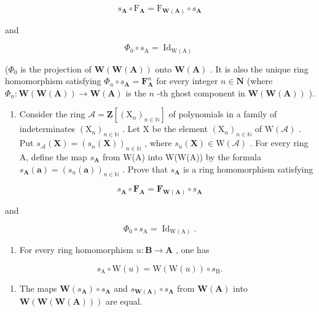 \[
s _ {\mathbf {A}} \circ \mathrm{F} _ {\mathbf {A}} = \mathrm{F} _ {\mathbf {W} (\mathbf {A})} \circ s _ {\mathbf {A}}
\]

and

\[
\Phi_ {0} \circ s _ {\mathrm{A}} = \operatorname{Id} _ {\mathrm{W(A)}}
\]

(\(\Phi_0\) is the projection of \(\mathbf{W}(\mathbf{W}(\mathbf{A}))\) onto \(\mathbf{W}(\mathbf{A})\) . It is also the unique ring homomorphism satisfying \(\Phi_n\circ s_{\mathbf{A}} = \mathbf{F}_{\mathbf{A}}^{n}\) for every integer \(n\in \mathbf{N}\) (where \(\Phi_n:\mathbf{W}(\mathbf{W}(\mathbf{A}))\to \mathbf{W}(\mathbf{A})\) is the \(n\) -th ghost component in \(\mathbf{W}(\mathbf{W}(\mathbf{A}))\) ).

\begin{enumerate}
\def\labelenumi{\alph{enumi})}
\setcounter{enumi}{1}
\tightlist
\item
  Consider the ring \(\mathcal{A} = \mathbf{Z}[(\mathrm{X}_n)_{n\in \mathbb{N}}]\) of polynomials in a family of indeterminates \((\mathrm{X}_n)_{n\in \mathbb{N}}\) . Let X be the element \((\mathrm{X}_n)_{n\in \mathbb{N}}\) of \(\mathrm{W}(\mathcal{A})\) . Put \(s_{\mathcal{A}}(\mathbf{X}) = (s_n(\mathbf{X}))_{n\in \mathbb{N}}\) , where \(s_n(\mathbf{X}) \in \mathrm{W}(\mathcal{A})\) . For every ring A, define the map \(s_{\mathbf{A}}\) from W(A) into W(W(A)) by the formula \(s_{\mathbf{A}}(\boldsymbol{a}) = (s_{n}(\boldsymbol{a}))_{n \in \mathbb{N}}\) . Prove that \(s_{\mathbf{A}}\) is a ring homomorphism satisfying
\end{enumerate}

\[
s _ {\mathbf {A}} \circ \mathbf {F} _ {\mathbf {A}} = \mathbf {F} _ {\mathbf {W} (\mathbf {A})} \circ s _ {\mathbf {A}}
\]

and

\[
\Phi_ {0} \circ s _ {\mathrm{A}} = \operatorname{Id} _ {\mathrm{W(A)}}.
\]

\begin{enumerate}
\def\labelenumi{\alph{enumi})}
\setcounter{enumi}{2}
\tightlist
\item
  For every ring homomorphism \(u: \mathbf{B} \to \mathbf{A}\) , one has
\end{enumerate}

\[
s _ {\mathrm{A}} \circ \mathrm{W} (u) = \mathrm{W} (\mathrm{W} (u)) \circ s _ {\mathrm{B}}.
\]

\begin{enumerate}
\def\labelenumi{\alph{enumi})}
\setcounter{enumi}{3}
\tightlist
\item
  The maps \(\mathbf{W}(s_{\mathbf{A}})\circ s_{\mathbf{A}}\) and \(s_{\mathbf{W(A)}}\circ s_{\mathbf{A}}\) from \(\mathbf{W}(\mathbf{A})\) into \(\mathbf{W}(\mathbf{W}(\mathbf{W}(\mathbf{A})))\) are equal.
\end{enumerate}

